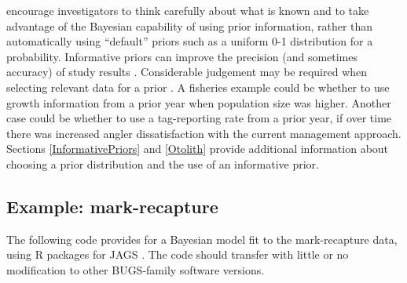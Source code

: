 \documentclass[
]{krantz}
\begin{document}
\citet{banner.etal_2020} encourage investigators to think carefully about what is known and to take advantage of the Bayesian capability of using prior information, rather than automatically using ``default'' priors such as a uniform 0-1 distribution for a probability. Informative priors can improve the precision (and sometimes accuracy) of study results \citep[e.g.,][]{doll.jacquemin_2018}. Considerable judgement may be required when selecting relevant data for a prior \citep{lunn.etal_2012}. A fisheries example could be whether to use growth information from a prior year when population size was higher. Another case could be whether to use a tag-reporting rate from a prior year, if over time there was increased angler dissatisfaction with the current management approach. Sections \ref{InformativePriors} and \ref{Otolith} provide additional information about choosing a prior distribution and the use of an informative prior.

\hypertarget{FirstExampleBayesian}{%
\subsection{Example: mark-recapture}\label{FirstExampleBayesian}}

The following code provides for a Bayesian model fit to the mark-recapture data, using R packages for JAGS \citep{plummer2003}. The code should transfer with little or no modification to other BUGS-family software versions.
\end{document}

